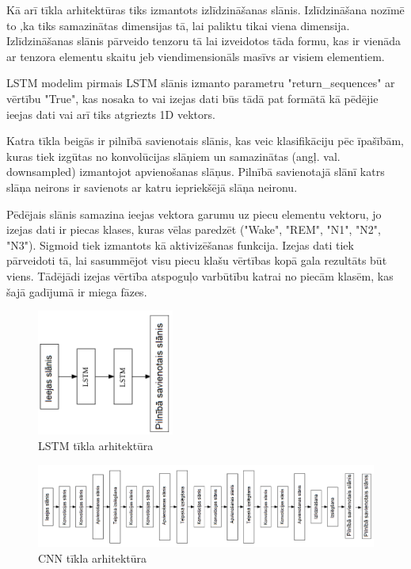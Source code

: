 \documentclass[12pt,paper=A4]{report}
\begin{document}
Kā arī tīkla arhitektūras tiks izmantots izlīdzināšanas slānis. Izlīdzināšana nozīmē to ,ka tiks samazinātas dimensijas tā, lai paliktu tikai viena dimensija. Izlīdzināšanas slānis pārveido tenzoru tā lai izveidotos tāda formu, kas ir vienāda ar tenzora elementu skaitu jeb viendimensionāls masīvs ar visiem elementiem. 

LSTM modelim pirmais LSTM slānis izmanto parametru "return_sequences" ar vērtību "True", kas nosaka to vai izejas dati būs tādā pat formātā kā pēdējie ieejas dati vai arī tiks atgriezts 1D vektors. 

Katra tīkla beigās ir pilnībā savienotais slānis, kas veic klasifikāciju pēc īpašībām, kuras tiek izgūtas no konvolūcijas slāņiem un samazinātas (angļ. val. downsampled) izmantojot apvienošanas slāņus. Pilnībā savienotajā slānī katrs slāņa neirons ir savienots ar katru iepriekšējā slāņa neironu.

Pēdējais slānis samazina ieejas vektora garumu uz piecu elementu vektoru, jo izejas dati ir piecas klases, kuras vēlas paredzēt ("Wake", "REM", "N1", "N2", "N3"). Sigmoid tiek izmantots kā aktivizēšanas funkcija. Izejas dati tiek pārveidoti tā, lai sasummējot visu piecu klašu vērtības kopā gala rezultāts būt viens. Tādējādi izejas vērtība atspoguļo varbūtību katrai no piecām klasēm, kas šajā gadījumā ir miega fāzes.

\begin{figure}[H] \centering
\includegraphics[width=0.40\textwidth]{CNNLSTMtikls} \caption{LSTM tīkla arhitektūra}  
\label{lstmarch} 
\end{figure}

\begin{figure}[H] \centering
\includegraphics[width=1.05\textwidth]{CNNtikls} \caption{CNN tīkla arhitektūra} 
\label{cnnmarch} 
\end{figure}
\end{document}
